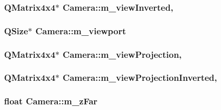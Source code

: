 \subsubsection[{m\+\_\+view\+Inverted}]{\setlength{\rightskip}{0pt plus 5cm}Q\+Matrix4x4$\ast$ Camera\+::m\+\_\+view\+Inverted\hspace{0.3cm}{\ttfamily [mutable]}, {\ttfamily [protected]}}\label{class_camera_a06be12235980a27d0e529de166117b3e}
\hypertarget{class_camera_ac6968a6be1441d8947d3376e983c592e}{}
\subsubsection[{m\+\_\+viewport}]{\setlength{\rightskip}{0pt plus 5cm}Q\+Size$\ast$ Camera\+::m\+\_\+viewport\hspace{0.3cm}{\ttfamily [protected]}}\label{class_camera_ac6968a6be1441d8947d3376e983c592e}
\hypertarget{class_camera_a00e4c0e94057379c97e8c71fd69995f7}{}
\subsubsection[{m\+\_\+view\+Projection}]{\setlength{\rightskip}{0pt plus 5cm}Q\+Matrix4x4$\ast$ Camera\+::m\+\_\+view\+Projection\hspace{0.3cm}{\ttfamily [mutable]}, {\ttfamily [protected]}}\label{class_camera_a00e4c0e94057379c97e8c71fd69995f7}
\hypertarget{class_camera_a29e1c120c55810920954e335eb60e84e}{}
\subsubsection[{m\+\_\+view\+Projection\+Inverted}]{\setlength{\rightskip}{0pt plus 5cm}Q\+Matrix4x4$\ast$ Camera\+::m\+\_\+view\+Projection\+Inverted\hspace{0.3cm}{\ttfamily [mutable]}, {\ttfamily [protected]}}\label{class_camera_a29e1c120c55810920954e335eb60e84e}
\hypertarget{class_camera_aa1aaffbfe1f859ff06ae57f7c1faa208}{}
\subsubsection[{m\+\_\+z\+Far}]{\setlength{\rightskip}{0pt plus 5cm}float Camera\+::m\+\_\+z\+Far\hspace{0.3cm}{\ttfamily [protected]}}\label{class_camera_aa1aaffbfe1f859ff06ae57f7c1faa208}
\hypertarget{class_camera_ae77d866ea9d0aa75853c8243154fca82}{}
